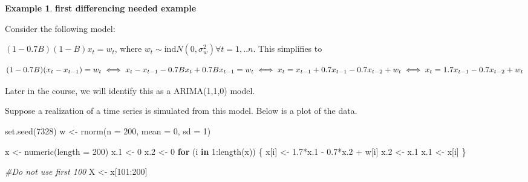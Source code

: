 \documentclass[
]{book}
\newenvironment{Shaded}{\begin{snugshade}}{\end{snugshade}}
\newcommand{\AttributeTok}[1]{\textcolor[rgb]{0.77,0.63,0.00}{#1}}
\newcommand{\CommentTok}[1]{\textcolor[rgb]{0.56,0.35,0.01}{\textit{#1}}}
\newcommand{\ControlFlowTok}[1]{\textcolor[rgb]{0.13,0.29,0.53}{\textbf{#1}}}
\newcommand{\DecValTok}[1]{\textcolor[rgb]{0.00,0.00,0.81}{#1}}
\newcommand{\FloatTok}[1]{\textcolor[rgb]{0.00,0.00,0.81}{#1}}
\newcommand{\FunctionTok}[1]{\textcolor[rgb]{0.00,0.00,0.00}{#1}}
\newcommand{\NormalTok}[1]{#1}
\newcommand{\OtherTok}[1]{\textcolor[rgb]{0.56,0.35,0.01}{#1}}
\newcommand{\SpecialCharTok}[1]{\textcolor[rgb]{0.00,0.00,0.00}{#1}}
\theoremstyle{definition}
\theoremstyle{definition}
\newtheorem{example}{Example}[chapter]
\theoremstyle{definition}
\theoremstyle{definition}
\theoremstyle{remark}
\begin{document}
\begin{example}
\textbf{first differencing needed example}

Consider the following model:

\((1-0.7B)(1-B)x_t=w_t\), where \(w_t \sim \mathrm{ind}N(0,\sigma^2_w) \forall t=1,..n\). This simplifies to

\[(1-0.7B)(x_t-x_{t-1})=w_t\\
\iff x_t-x_{t-1}-0.7Bx_t+0.7Bx_{t-1}=w_t\\
\iff x_t=x_{t-1}+0.7x_{t-1}-0.7x_{t-2}+w_t\\
\iff x_t=1.7x_{t-1}-0.7x_{t-2}+w_t\]

Later in the course, we will identify this as a ARIMA(1,1,0) model.

Suppose a realization of a time series is simulated from this model. Below is a plot of the data.

\begin{Shaded}
\begin{Highlighting}[]
\FunctionTok{set.seed}\NormalTok{(}\DecValTok{7328}\NormalTok{)  }
\NormalTok{w }\OtherTok{\textless{}{-}} \FunctionTok{rnorm}\NormalTok{(}\AttributeTok{n =} \DecValTok{200}\NormalTok{, }\AttributeTok{mean =} \DecValTok{0}\NormalTok{, }\AttributeTok{sd =} \DecValTok{1}\NormalTok{)}

\NormalTok{x }\OtherTok{\textless{}{-}} \FunctionTok{numeric}\NormalTok{(}\AttributeTok{length =} \DecValTok{200}\NormalTok{)}
\NormalTok{x}\FloatTok{.1} \OtherTok{\textless{}{-}} \DecValTok{0}
\NormalTok{x}\FloatTok{.2} \OtherTok{\textless{}{-}} \DecValTok{0}
\ControlFlowTok{for}\NormalTok{ (i }\ControlFlowTok{in} \DecValTok{1}\SpecialCharTok{:}\FunctionTok{length}\NormalTok{(x)) \{}
\NormalTok{  x[i] }\OtherTok{\textless{}{-}} \FloatTok{1.7}\SpecialCharTok{*}\NormalTok{x}\FloatTok{.1} \SpecialCharTok{{-}} \FloatTok{0.7}\SpecialCharTok{*}\NormalTok{x}\FloatTok{.2} \SpecialCharTok{+}\NormalTok{ w[i] }
\NormalTok{  x}\FloatTok{.2} \OtherTok{\textless{}{-}}\NormalTok{ x}\FloatTok{.1}
\NormalTok{  x}\FloatTok{.1} \OtherTok{\textless{}{-}}\NormalTok{ x[i] }
\NormalTok{\}}

\CommentTok{\#Do not use first 100}
\NormalTok{X }\OtherTok{\textless{}{-}}\NormalTok{ x[}\DecValTok{101}\SpecialCharTok{:}\DecValTok{200}\NormalTok{]}
\end{Highlighting}
\end{Shaded}


\end{example}
\end{document}
